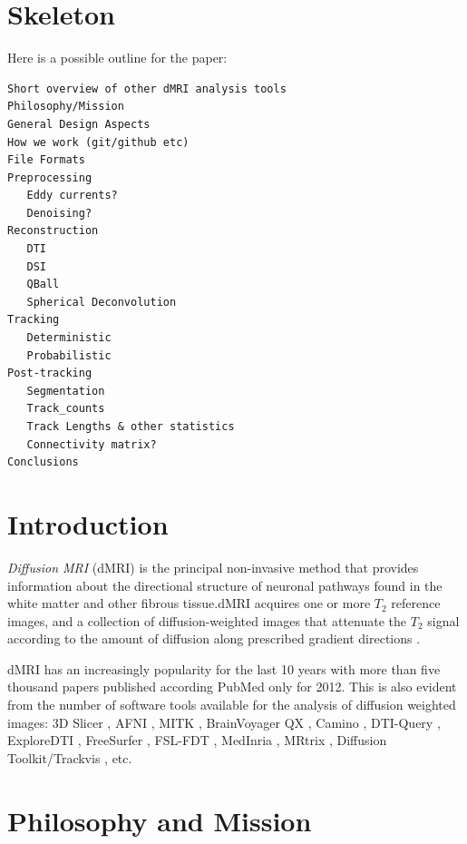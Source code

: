 \documentclass{bioinfo}
\begin{document}
\section{Skeleton}

Here is a possible outline for the paper:

\begin{verbatim}
Short overview of other dMRI analysis tools
Philosophy/Mission
General Design Aspects
How we work (git/github etc)
File Formats 
Preprocessing
   Eddy currents?
   Denoising?
Reconstruction
   DTI 
   DSI
   QBall
   Spherical Deconvolution 
Tracking
   Deterministic
   Probabilistic
Post-tracking
   Segmentation
   Track_counts
   Track Lengths & other statistics
   Connectivity matrix?
Conclusions
\end{verbatim}


\section{Introduction}

\emph{Diffusion MRI} (dMRI) \citep{stejskal-tanner:65, lebihan-breton:85,merboldt-hanicke-etal:85, taylor-bushell:85, callaghan:91} is the principal non-invasive method that provides information about the directional structure of neuronal pathways found in the white matter and other fibrous tissue.dMRI acquires one or more $T_{2}$ reference images, and a collection of diffusion-weighted images that attenuate the $T_{2}$ signal according to the amount of diffusion along prescribed gradient directions \citep{behrens-johansen-berg:09, jones:10}. 

dMRI has an increasingly popularity for the last 10 years with more than five thousand papers published according PubMed only for 2012. This is also evident from the number of software tools available for the analysis of diffusion weighted images: 3D Slicer \citep{pieper:06}, AFNI \citep{cox-afni:12}, MITK \citep{fritzsche-mitk:12}, BrainVoyager QX \citep{goebel-brainvoyager:12}, Camino \citep{Cook2006}, DTI-Query \citep{sherbondy:05}, ExploreDTI \citep{leemans-exploredti:09}, FreeSurfer \citep{fischl-freesurfer:12}, FSL-FDT \citep{smith-fdt:04}, MedInria \citep{toussaint-souplet-etal:07}, MRtrix \citep{Tournier2012}, Diffusion Toolkit/Trackvis \citep{wang-diffusion-toolkit:07}, etc.


\section{Philosophy and Mission}
\end{document}
